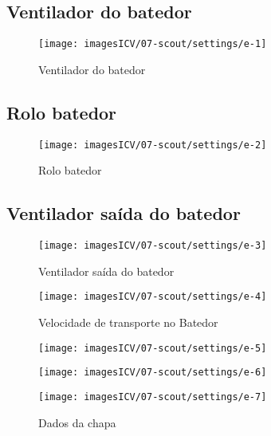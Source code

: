 \usepackage{graphicx}
\usepackage{wasysym}
\newpage
\thispagestyle{fancy}
\vspace{\fill}

\subsection{\small Ventilador do batedor}
\begin{figure}
    \centering
    \texttt{[image: imagesICV/07-scout/settings/e-1]}
    \caption{Ventilador do batedor}
\end{figure}
\newpage

\thispagestyle{fancy}
\vspace{\fill}
\subsection{\small Rolo batedor}
\begin{figure}
    \centering
    \texttt{[image: imagesICV/07-scout/settings/e-2]}
    \caption{Rolo batedor}
\end{figure}
\newpage

\thispagestyle{fancy}
\vspace{\fill}
\subsection{\small Ventilador saída do batedor}
\begin{figure}
    \centering
    \texttt{[image: imagesICV/07-scout/settings/e-3]}
    \caption{Ventilador saída do batedor}
\end{figure}
\newpage

\thispagestyle{fancy}
\vspace{\fill}
\begin{figure}
    \centering
    \texttt{[image: imagesICV/07-scout/settings/e-4]}
    \caption{Velocidade de transporte no Batedor}
    \label{}
\end{figure}
\newpage

\thispagestyle{fancy}
\vspace{\fill}
\begin{figure}
    \centering
    \texttt{[image: imagesICV/07-scout/settings/e-5]}
    \caption{}
\end{figure}
\newpage

\thispagestyle{fancy}
\vspace{\fill}
\begin{figure}
    \centering
    \texttt{[image: imagesICV/07-scout/settings/e-6]}
    \caption{}
\end{figure}
\newpage

\thispagestyle{fancy}
\vspace{\fill}
\begin{figure}
    \centering
    \texttt{[image: imagesICV/07-scout/settings/e-7]}
    \caption{Dados da chapa}
\end{figure}
